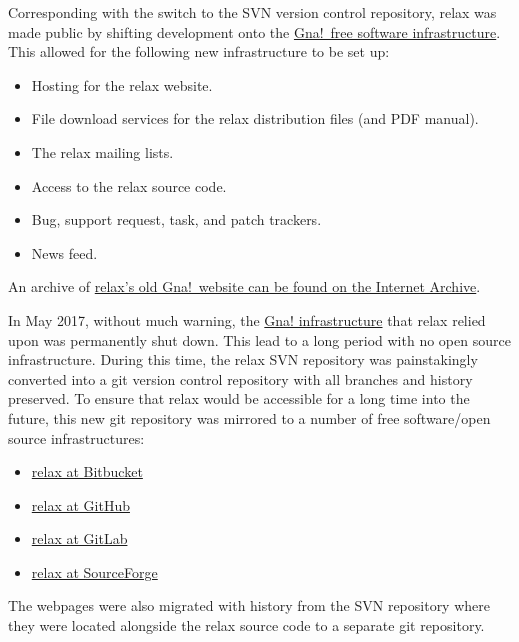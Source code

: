 Corresponding with the switch to the SVN version control repository, relax was made public by shifting development onto the \href{https://en.wikipedia.org/wiki/Gna!}{Gna!\ free software infrastructure}.
This allowed for the following new infrastructure to be set up:
\begin{itemize}
    \item Hosting for the relax website.
    \item File download services for the relax distribution files (and PDF manual).
    \item The relax mailing lists.
    \item Access to the relax source code.
    \item Bug, support request, task, and patch trackers.
    \item News feed.
\end{itemize}
An archive of \href{https://web.archive.org/web/20170301004608/https://gna.org/projects/relax/}{relax's old Gna!\ website can be found on the Internet Archive}.

In May 2017, without much warning, the \href{https://en.wikipedia.org/wiki/Gna!}{Gna! infrastructure} that relax relied upon was permanently shut down.
This lead to a long period with no open source infrastructure.
During this time, the relax SVN repository was painstakingly converted into a git version control repository with all branches and history preserved.
To ensure that relax would be accessible for a long time into the future, this new git repository was mirrored to a number of free software/open source infrastructures:
\begin{itemize}
    \item \href{https://bitbucket.org/nmr-relax/}{relax at Bitbucket}
    \item \href{https://github.com/nmr-relax}{relax at GitHub}
    \item \href{https://gitlab.com/nmr-relax}{relax at GitLab}
    \item \href{https://sourceforge.net/projects/nmr-relax/}{relax at SourceForge}
\end{itemize}
The webpages were also migrated with history from the SVN repository where they were located alongside the relax source code to a separate git repository.

